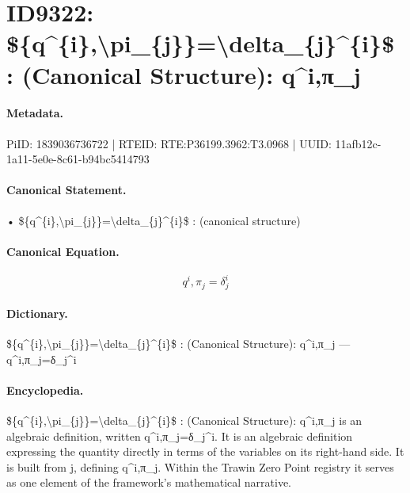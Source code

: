 \section*{ID9322: \$\{q\textasciicircum{}\{i\},\textbackslash{}pi\_\{j\}\}=\textbackslash{}delta\_\{j\}\textasciicircum{}\{i\}\$ : (Canonical Structure): q\textasciicircum{}i,π\_j}
\paragraph{Metadata.}
PiID: 1839036736722 | RTEID: RTE:P36199.3962:T3.0968 | UUID: 11afb12c-1a11-5e0e-8c61-b94bc5414793

\paragraph{Canonical Statement.}
• \$\{q\textasciicircum{}\{i\},\textbackslash{}pi\_\{j\}\}=\textbackslash{}delta\_\{j\}\textasciicircum{}\{i\}\$ : (canonical structure)

\paragraph{Canonical Equation.}
\[
{q^{i},\pi_{j}}=\delta_{j}^{i}
\]

\paragraph{Dictionary.}
\$\{q\textasciicircum{}\{i\},\textbackslash{}pi\_\{j\}\}=\textbackslash{}delta\_\{j\}\textasciicircum{}\{i\}\$ : (Canonical Structure): q\textasciicircum{}i,π\_j — q\textasciicircum{}i,π\_j=δ\_j\textasciicircum{}i

\paragraph{Encyclopedia.}
\$\{q\textasciicircum{}\{i\},\textbackslash{}pi\_\{j\}\}=\textbackslash{}delta\_\{j\}\textasciicircum{}\{i\}\$ : (Canonical Structure): q\textasciicircum{}i,π\_j is an algebraic definition, written q\textasciicircum{}i,π\_j=δ\_j\textasciicircum{}i. It is an algebraic definition expressing the quantity directly in terms of the variables on its right-hand side. It is built from j, defining q\textasciicircum{}i,π\_j. Within the Trawin Zero Point registry it serves as one element of the framework's mathematical narrative.
